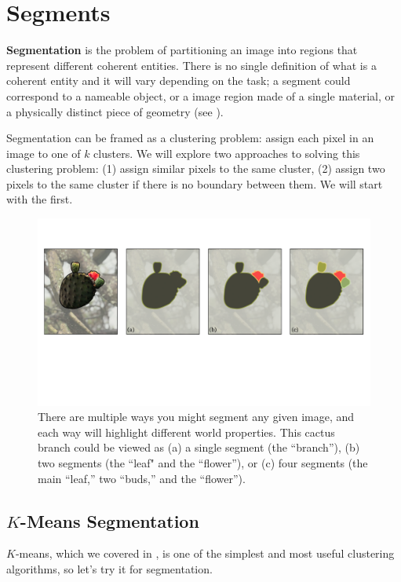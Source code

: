 \section{Segments}

\textbf{Segmentation} is the problem of partitioning an image into regions that represent different coherent entities. There is no single definition of what is a coherent entity and it will vary depending on the task; a segment could correspond to a nameable object, or a image region made of a single material, or a physically distinct piece of geometry (see \fig{\ref{fig:perceptual_organization:ambiguous_segmentation_example}}).

Segmentation can be framed as a clustering problem: assign each pixel in an image to one of $k$ clusters. We will explore two approaches to solving this clustering problem: (1) assign similar pixels to the same cluster, (2) assign two pixels to the same cluster if there is no boundary between them. We will start with the first.

\begin{figure}[h!]
    \centerline{
    \includegraphics[width=1.0\linewidth]{./figures/perceptual_organization/ambiguous_segmentation_example.pdf}
    }
    \caption{There are multiple ways you might segment any given image, and each way will highlight different world properties. This cactus branch could be viewed as (a) a single segment (the ``branch''), (b) two segments (the ``leaf" and the ``flower''), or (c) four segments (the main ``leaf,'' two ``buds,'' and the ``flower'').}
    \label{fig:perceptual_organization:ambiguous_segmentation_example}
\end{figure}
\vspace{-0.4cm}

\subsection{$K$-Means Segmentation}
$K$-means, which we covered in \chap{\ref{chapter:representation_learning}}, is one of the simplest and most useful clustering algorithms, so let's try it for segmentation.

